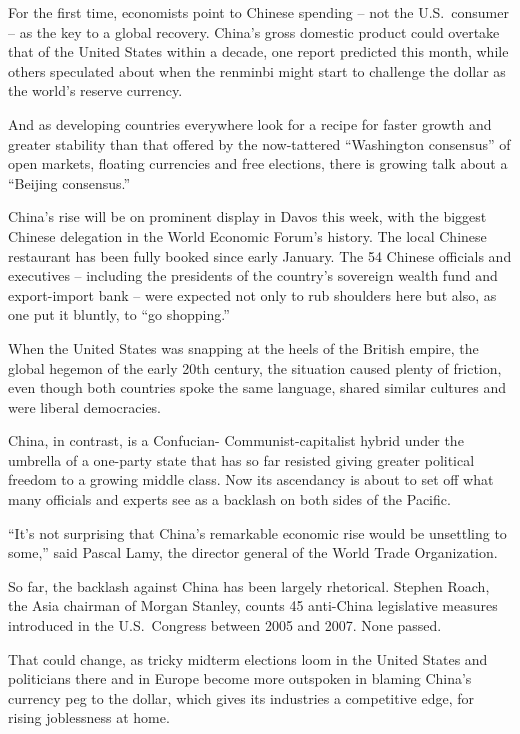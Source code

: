 ﻿\documentclass[12pt]{article}
\begin{document}
For the first time, economists point to Chinese spending -- not the U.S.~consumer -- as the key to a
global recovery. China's gross domestic product could overtake that of the United States within a
decade, one report predicted this month, while others speculated about when the renminbi might start
to challenge the dollar as the world's reserve currency.

And as developing countries everywhere look for a recipe for faster growth and greater stability
than that offered by the now-tattered ``Washington consensus'' of open markets, floating currencies
and free elections, there is growing talk about a ``Beijing consensus.''

China's rise will be on prominent display in Davos this week, with the biggest Chinese delegation in
the World Economic Forum's history. The local Chinese restaurant has been fully booked since early
January. The 54 Chinese officials and executives -- including the presidents of the country's
sovereign wealth fund and export-import bank -- were expected not only to rub shoulders here but
also, as one put it bluntly, to ``go shopping.''

When the United States was snapping at the heels of the British empire, the global hegemon of the
early 20th century, the situation caused plenty of friction, even though both countries spoke the
same language, shared similar cultures and were liberal democracies.

China, in contrast, is a Confucian- Communist-capitalist hybrid under the umbrella of a one-party
state that has so far resisted giving greater political freedom to a growing middle class. Now its
ascendancy is about to set off what many officials and experts see as a backlash on both sides of
the Pacific.

``It's not surprising that China's remarkable economic rise would be unsettling to some,'' said
Pascal Lamy, the director general of the World Trade Organization.

So far, the backlash against China has been largely rhetorical. Stephen Roach, the Asia chairman of
Morgan Stanley, counts 45 anti-China legislative measures introduced in the U.S.~Congress between
2005 and 2007. None passed.

That could change, as tricky midterm elections loom in the United States and politicians there and
in Europe become more outspoken in blaming China's currency peg to the dollar, which gives its
industries a competitive edge, for rising joblessness at home.
\end{document}
